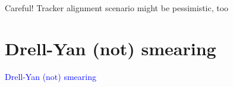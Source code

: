 \documentclass[compress]{beamer}
\begin{document}
\begin{frame}
\begin{columns}
\end{columns}

\vspace{0.25 cm}
Careful!  Tracker alignment scenario might be pessimistic, too
\end{frame}

\section*{Drell-Yan (not) smearing}

\begin{frame}
\begin{center}
\Huge \textcolor{blue}{Drell-Yan (not) smearing}
\end{center}
\end{frame}
\end{document}
